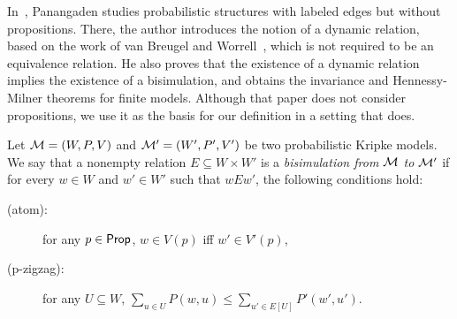 In~\cite{Panangaden2011}, Panangaden studies probabilistic structures with labeled edges but without propositions. There, the author introduces the notion of a dynamic relation, based on the work of van Breugel and Worrell~\cite{BW01b,BW01a}, which is not required to be an equivalence relation. He also proves that the existence of a dynamic relation implies the existence of a bisimulation, and obtains the invariance and Hennessy-Milner theorems for finite models. Although that paper does not consider propositions, we use it as the basis for our definition in a setting that does.

\begin{definition}[Bisimulation]\label{bis} Let  $\mathcal{M}=(W,P, V)$ and  $\mathcal{M}' = (W', P', V')$ be two probabilistic Kripke models. We say that a nonempty relation $E\subseteq W\times W'$ is a \emph{bisimulation from $\mathcal{M}$ to $\mathcal{M}'$} if for every $w \in W$ and $w' \in W'$ such that $wEw'$, the following conditions hold:
\begin{description}
    \item[(atom):] for any $p \in \mathsf{Prop}$, $w\in V(p)$ iff $w'\in V'(p)$,
    \item[(p-zigzag):] for any $U \subseteq W$, $\displaystyle \sum_{u \in U} P(w, u) \leq \displaystyle \sum_{u' \in E[U]} P'(w', u')$.
\end{description}
\end{definition}

